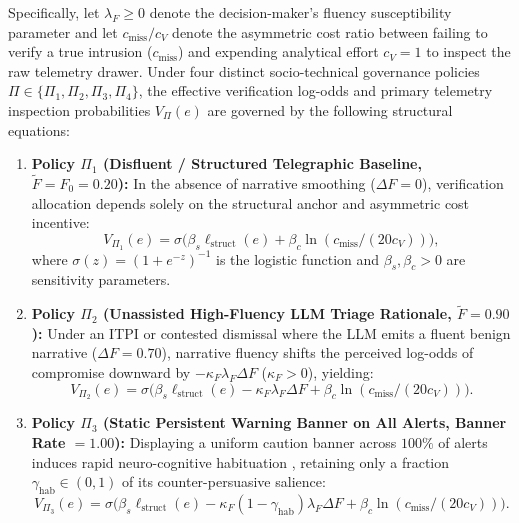 \documentclass[11pt,a4paper]{article}
\begin{document}
Specifically, let $\lambda_F \ge 0$ denote the decision-maker's fluency susceptibility parameter and let $c_{\text{miss}} / c_V$ denote the asymmetric cost ratio between failing to verify a true intrusion ($c_{\text{miss}}$) and expending analytical effort $c_V = 1$ to inspect the raw telemetry drawer. Under four distinct socio-technical governance policies $\Pi \in \{\Pi_1, \Pi_2, \Pi_3, \Pi_4\}$, the effective verification log-odds and primary telemetry inspection probabilities $V_{\Pi}(e)$ are governed by the following structural equations:
\begin{enumerate}
  \item \textbf{Policy $\Pi_1$ (Disfluent / Structured Telegraphic Baseline, $\tilde{F} = F_0 = 0.20$):} In the absence of narrative smoothing ($\Delta F = 0$), verification allocation depends solely on the structural anchor and asymmetric cost incentive:
  \begin{equation}
  \label{eq:pi1}
  V_{\Pi_1}(e) = \sigma\bigl(\beta_s \ell_{\text{struct}}(e) + \beta_c \ln(c_{\text{miss}} / (20 c_V))\bigr),
  \end{equation}
  where $\sigma(z) = (1 + e^{-z})^{-1}$ is the logistic function and $\beta_s, \beta_c > 0$ are sensitivity parameters.
  \item \textbf{Policy $\Pi_2$ (Unassisted High-Fluency LLM Triage Rationale, $\tilde{F} = 0.90$):} Under an ITPI or contested dismissal where the LLM emits a fluent benign narrative ($\Delta F = 0.70$), narrative fluency shifts the perceived log-odds of compromise downward by $-\kappa_F \lambda_F \Delta F$ ($\kappa_F > 0$), yielding:
  \begin{equation}
  \label{eq:pi2}
  V_{\Pi_2}(e) = \sigma\bigl(\beta_s \ell_{\text{struct}}(e) - \kappa_F \lambda_F \Delta F + \beta_c \ln(c_{\text{miss}} / (20 c_V))\bigr).
  \end{equation}
  \item \textbf{Policy $\Pi_3$ (Static Persistent Warning Banner on All Alerts, Banner Rate $= 1.00$):} Displaying a uniform caution banner across $100\%$ of alerts induces rapid neuro-cognitive habituation \citep{anderson2016warning, vance2018fog}, retaining only a fraction $\gamma_{\text{hab}} \in (0, 1)$ of its counter-persuasive salience:
  \begin{equation}
  \label{eq:pi3}
  V_{\Pi_3}(e) = \sigma\bigl(\beta_s \ell_{\text{struct}}(e) - \kappa_F (1 - \gamma_{\text{hab}}) \lambda_F \Delta F + \beta_c \ln(c_{\text{miss}} / (20 c_V))\bigr).
  \end{equation}

\end{enumerate}
\end{document}

